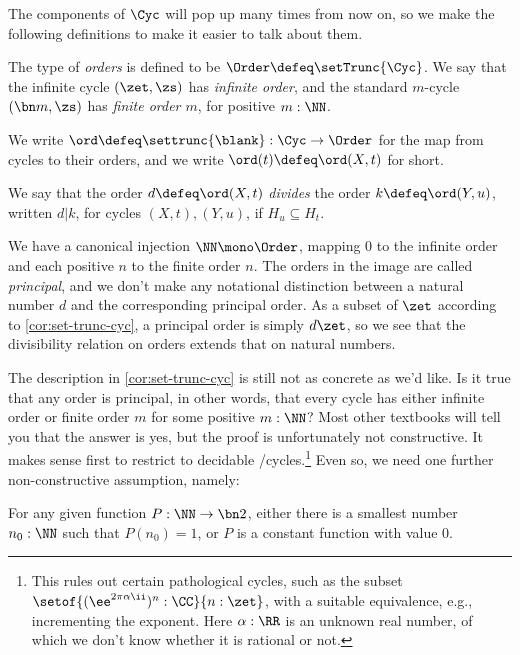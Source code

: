 The components of $\Cyc$ will pop up many times from now on,
so we make the following definitions to make it easier to talk about them.
\begin{definition}\label{def:Order}
  The type of \emph{orders} is defined to be
  $\Order\defeq\setTrunc{\Cyc}$.
  We say that the infinite cycle $(\zet,\zs)$ has \emph{infinite order},
  and the standard $m$-cycle $(\bn m,\zs)$ has \emph{finite order $m$},
  for positive $m:\NN$.

  We write $\ord\defeq\settrunc{\blank}:\Cyc\to\Order$ for the map
  from cycles to their orders, and we write $\ord(t)\defeq\ord(X,t)$ for short.

  We say that the order $d\defeq\ord(X,t)$ \emph{divides} the 
  order $k\defeq\ord(Y,u)$, written $d | k$,
  for cycles $(X,t),(Y,u)$, if $H_u \subseteq H_t$.
\end{definition}
We have a canonical injection $\NN \mono \Order$,
mapping $0$ to the infinite order and each positive $n$ to the finite order $n$.
The orders in the image are called \emph{principal},
and we don't make any notational distinction between a natural number $d$
and the corresponding principal order.
As a subset of $\zet$ according to \cref{cor:set-trunc-cyc}, 
a principal order is simply $d\zet$,
so we see that the divisibility relation on orders extends 
that on natural numbers.

The description in \cref{cor:set-trunc-cyc} is still not as concrete as we'd like.
Is it true that any order is principal, in other words,
that every cycle has either infinite order or finite order $m$
for some positive $m:\NN$?
Most other textbooks will tell you that the answer is yes,
but the proof is unfortunately not constructive.
It makes sense first to restrict to decidable \coverings/cycles.\footnote{%
  This rules out certain pathological cycles,
  such as the subset $\setof{(\ee^{2\pi\alpha\ii})^n:\CC}{n:\zet}$,
  with a suitable equivalence, e.g., incrementing the exponent.
  Here $\alpha:\RR$ is an unknown real number,
  of which we don't know whether it is rational or not.}
Even so, we need one further non-constructive assumption, namely:

\begin{principle}
  \label{LPO}%
  For any given function $P:\NN\to\bn 2$,
  either there is a smallest number $n_0:\NN$ such that $P(n_0)=1$,
  or $P$ is a constant function with value $0$.
\end{principle}


